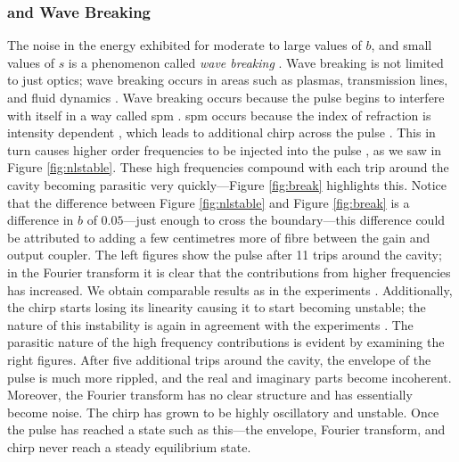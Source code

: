 \subsubsection{ and Wave Breaking}

The noise in the energy exhibited for moderate to large values of $b$, and small values of $s$ is a phenomenon called \emph{wave breaking} \cite{agrawal2013, anderson, finot, rothenberg, tomlinson}. Wave breaking is not limited to just optics; wave breaking occurs in areas such as plasmas, transmission lines, and fluid dynamics \cite{rothenberg}. Wave breaking occurs because the pulse begins to interfere with itself in a way called \gls{spm} \cite{agrawal2002, agrawal2013, becker}. \gls{spm} occurs because the index of refraction is intensity dependent \cite{agrawal2002, becker, rothenberg, silfvast}, which leads to additional chirp across the pulse \cite{agrawal2013, anderson, rothenberg, silfvast}. This in turn causes higher order frequencies to be injected into the pulse \cite{agrawal2013, anderson}, as we saw in Figure \ref{fig:nlstable}. These high frequencies compound with each trip around the cavity becoming parasitic very quickly---Figure \ref{fig:break} highlights this. Notice that the difference between Figure \ref{fig:nlstable} and Figure \ref{fig:break} is a difference in $b$ of $0.05$---just enough to cross the boundary---this difference could be attributed to adding a few centimetres more of fibre between the gain and output coupler. The left figures show the pulse after 11 trips around the cavity; in the Fourier transform it is clear that the contributions from higher frequencies has increased. We obtain comparable results as in the experiments \cite{anderson, rothenberg}. Additionally, the chirp starts losing its linearity causing it to start becoming unstable; the nature of this instability is again in agreement with the experiments \cite{anderson, rothenberg}. The parasitic nature of the high frequency contributions is evident by examining the right figures. After five additional trips around the cavity, the envelope of the pulse is much more rippled, and the real and imaginary parts become incoherent. Moreover, the Fourier transform has no clear structure and has essentially become noise. The chirp has grown to be highly oscillatory and unstable. Once the pulse has reached a state such as this---the envelope, Fourier transform, and chirp never reach a steady equilibrium state. \\

